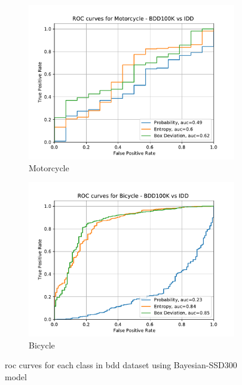     \begin{figure} \ContinuedFloat
    
    	\begin{subfigure}[t]{0.495\textwidth}
    		\centering
    		\includegraphics[width=\textwidth]{images/ROC/motorcycle_ROC_bdd_vs_idd_Score_using_bnn.pdf}
    		\caption{Motorcycle}
    	\end{subfigure}
    	\begin{subfigure}[t]{0.495\textwidth}
    		\centering
    		\includegraphics[width=\textwidth]{images/ROC/bicycle_ROC_bdd_vs_idd_Score_using_bnn.pdf}
    		\caption{Bicycle}
    	\end{subfigure}
        \vspace*{-3mm}
        \caption[Class-wise ROC curves for \acrshort{ood} sample classification using uncertainty quantification metrics with \acrshort{bnn}]{\acrlong{roc} curves for each class in \acrshort{bdd} dataset using Bayesian-SSD300 model}
        \label{fig:roc_bnn}
    \end{figure}


